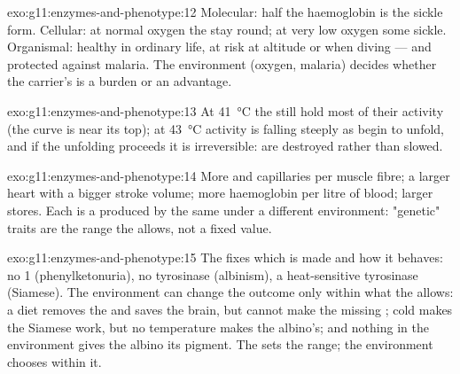 \begin{solution}{exo:g11:enzymes-and-phenotype:12}
Molecular: half the haemoglobin is the sickle form. Cellular: at
normal oxygen the  stay round; at very low oxygen some sickle.
Organismal: healthy in ordinary life, at risk at altitude or when
diving --- and protected against malaria. The environment (oxygen,
malaria) decides whether the carrier's  is a burden or an
advantage.
\end{solution}

\begin{solution}{exo:g11:enzymes-and-phenotype:13}
At \qty{41}{\celsius} the  still hold most of their activity
(the curve is near its top); at \qty{43}{\celsius} activity is falling
steeply as  begin to unfold, and if the unfolding proceeds it
is irreversible:  are destroyed rather than slowed.
\end{solution}

\begin{solution}{exo:g11:enzymes-and-phenotype:14}
More  and capillaries per muscle fibre; a larger heart
with a bigger stroke volume; more haemoglobin per litre of blood;
larger  stores. Each is a  produced by the same
 under a different environment: "genetic" traits are the
range the  allows, not a fixed value.
\end{solution}

\begin{solution}{exo:g11:enzymes-and-phenotype:15}
The  fixes which  is made and how it behaves: no 
1 (phenylketonuria), no tyrosinase (albinism), a heat-sensitive
tyrosinase (Siamese). The environment can change the outcome only
within what the  allows: a diet removes the  and saves
the brain, but cannot make the missing ; cold makes the Siamese
 work, but no temperature makes the albino's; and nothing in the
environment gives the albino its pigment. The  sets the range;
the environment chooses within it.
\end{solution}


